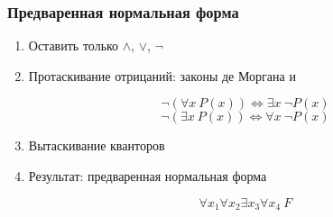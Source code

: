 \documentclass[24pt,pdf,hyperref={unicode},aspectratio=169]{beamer}
\begin{document}
\begin{frame}\frametitle{Предваренная нормальная форма}
\begin{enumerate}
\item<1-> Оставить только $\wedge$, $\vee$, $\neg$
\item<2-> Протаскивание отрицаний: законы де Моргана и

$$
\neg(\forall x\ P(x))\Leftrightarrow \exists x\ \neg P(x)
$$
$$
\neg(\exists x\ P(x))\Leftrightarrow \forall x\ \neg P(x)
$$
\item<3-> { Вытаскивание кванторов }

\begin{center}






\end{center}
\item<9-> Результат: предваренная нормальная форма

$$
\forall x_1 \forall x_2 \exists x_3 \forall x_4\ F
$$
\end{enumerate}

\end{frame}
\end{document}
